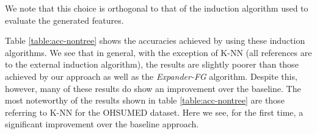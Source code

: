 \documentclass{article}
\theoremstyle{definition}
\begin{document}
We note that this choice is orthogonal to that of the induction algorithm used to evaluate the generated features.

Table \ref{table:acc-nontree} shows the accuracies achieved by using these induction algorithms. We see that in general, with the exception of K-NN (all references are to the external induction algorithm), the results are slightly poorer than those achieved by our approach as well as the \emph{Expander-FG} algorithm. Despite this, however,  many of these results do show an improvement over the baseline.
The most noteworthy of the results shown in table \ref{table:acc-nontree} are those referring to K-NN for the OHSUMED dataset. Here we see, for the first time, a significant improvement over the baseline approach.
\end{document}
